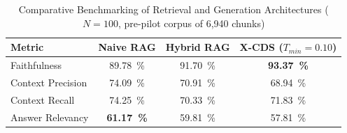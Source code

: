 \begin{table}[htbp]
\centering
\caption{Comparative Benchmarking of Retrieval and Generation Architectures ($N=100$, pre-pilot corpus of 6,940 chunks)}
\label{tab:benchmark}
\begin{tabular}{lccc}
\toprule
Metric & Naive RAG & Hybrid RAG & X-CDS ($T_{min}{=}0.10$) \\
\midrule
Faithfulness & \SI{89.78}{\percent} & \SI{91.70}{\percent} & \textbf{\SI{93.37}{\percent}} \\
Context Precision & \SI{74.09}{\percent} & \SI{70.91}{\percent} & \SI{68.94}{\percent} \\
Context Recall & \SI{74.25}{\percent} & \SI{70.33}{\percent} & \SI{71.83}{\percent} \\
Answer Relevancy & \textbf{\SI{61.17}{\percent}} & \SI{59.81}{\percent} & \SI{57.81}{\percent} \\
\bottomrule
\end{tabular}
\end{table}
